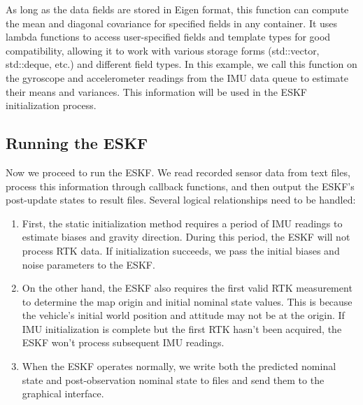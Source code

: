 As long as the data fields are stored in Eigen format, this function can compute the mean and diagonal covariance for specified fields in any container. It uses lambda functions to access user-specified fields and template types for good compatibility, allowing it to work with various storage forms (std::vector, std::deque, etc.) and different field types. In this example, we call this function on the gyroscope and accelerometer readings from the IMU data queue to estimate their means and variances. This information will be used in the ESKF initialization process.

\subsection{Running the ESKF}
Now we proceed to run the ESKF. We read recorded sensor data from text files, process this information through callback functions, and then output the ESKF's post-update states to result files. Several logical relationships need to be handled:

\begin{enumerate}
\item First, the static initialization method requires a period of IMU readings to estimate biases and gravity direction. During this period, the ESKF will not process RTK data. If initialization succeeds, we pass the initial biases and noise parameters to the ESKF.

\item On the other hand, the ESKF also requires the first valid RTK measurement to determine the map origin and initial nominal state values. This is because the vehicle's initial world position and attitude may not be at the origin. If IMU initialization is complete but the first RTK hasn't been acquired, the ESKF won't process subsequent IMU readings.

\item When the ESKF operates normally, we write both the predicted nominal state and post-observation nominal state to files and send them to the graphical interface.
\end{enumerate}

